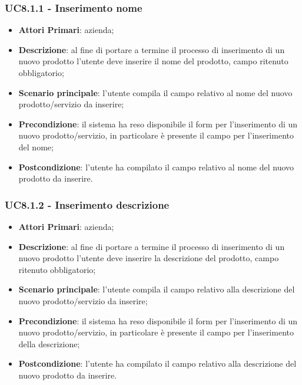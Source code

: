 \subsubsection{UC8.1.1 - Inserimento nome}
\begin{itemize}
	\item \textbf{Attori Primari}: azienda;
	\item \textbf{Descrizione}: al fine di portare a termine il processo di inserimento di un nuovo prodotto l'utente deve inserire il nome del prodotto, campo ritenuto obbligatorio;
	\item \textbf{Scenario principale}: l'utente compila il campo relativo al nome del nuovo prodotto/servizio da inserire;
	\item \textbf{Precondizione}: il sistema ha reso disponibile il form per l'inserimento di un nuovo prodotto/servizio, in particolare è presente il campo per l'inserimento del nome;
	\item \textbf{Postcondizione}: l'utente ha compilato il campo relativo al nome del nuovo prodotto da inserire.
\end{itemize}
\subsubsection{UC8.1.2 - Inserimento descrizione}
\begin{itemize}
	\item \textbf{Attori Primari}: azienda;
	\item \textbf{Descrizione}: al fine di portare a termine il processo di inserimento di un nuovo prodotto l'utente deve inserire la descrizione del prodotto, campo ritenuto obbligatorio;
	\item \textbf{Scenario principale}: l'utente compila il campo relativo alla descrizione del nuovo prodotto/servizio da inserire;
	\item \textbf{Precondizione}: il sistema ha reso disponibile il form per l'inserimento di un nuovo prodotto/servizio, in particolare è presente il campo per l'inserimento della descrizione;
	\item \textbf{Postcondizione}: l'utente ha compilato il campo relativo alla descrizione del nuovo prodotto da inserire.
\end{itemize}
